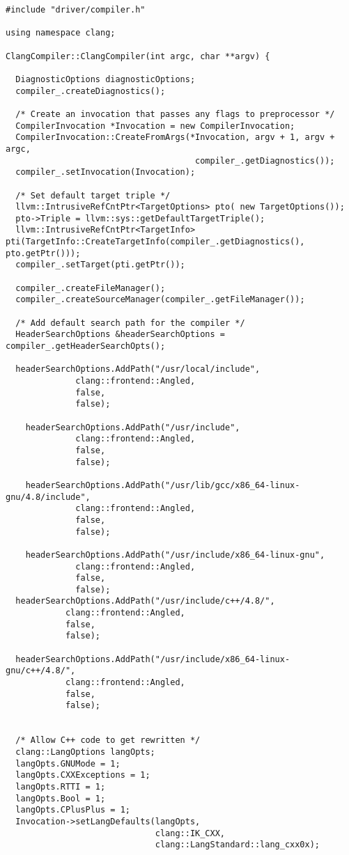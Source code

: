 \documentclass[a4paper,10pt,twoside]{book}
\begin{document}
\begin{lstlisting}[language=CCC, caption=driver/compiler.cpp]
#include "driver/compiler.h"

using namespace clang;

ClangCompiler::ClangCompiler(int argc, char **argv) {

  DiagnosticOptions diagnosticOptions;
  compiler_.createDiagnostics();

  /* Create an invocation that passes any flags to preprocessor */
  CompilerInvocation *Invocation = new CompilerInvocation;
  CompilerInvocation::CreateFromArgs(*Invocation, argv + 1, argv + argc,
                                      compiler_.getDiagnostics());
  compiler_.setInvocation(Invocation);

  /* Set default target triple */
  llvm::IntrusiveRefCntPtr<TargetOptions> pto( new TargetOptions());
  pto->Triple = llvm::sys::getDefaultTargetTriple();
  llvm::IntrusiveRefCntPtr<TargetInfo> pti(TargetInfo::CreateTargetInfo(compiler_.getDiagnostics(), pto.getPtr()));
  compiler_.setTarget(pti.getPtr());

  compiler_.createFileManager();
  compiler_.createSourceManager(compiler_.getFileManager());

  /* Add default search path for the compiler */
  HeaderSearchOptions &headerSearchOptions = compiler_.getHeaderSearchOpts();

  headerSearchOptions.AddPath("/usr/local/include",
	          clang::frontend::Angled,
	          false,
	          false);

	headerSearchOptions.AddPath("/usr/include",
	          clang::frontend::Angled,
	          false,
	          false);

	headerSearchOptions.AddPath("/usr/lib/gcc/x86_64-linux-gnu/4.8/include",
	          clang::frontend::Angled,
	          false,
	          false);

	headerSearchOptions.AddPath("/usr/include/x86_64-linux-gnu",
	          clang::frontend::Angled,
	          false,
	          false);
  headerSearchOptions.AddPath("/usr/include/c++/4.8/",
            clang::frontend::Angled,
            false,
            false);

  headerSearchOptions.AddPath("/usr/include/x86_64-linux-gnu/c++/4.8/",
            clang::frontend::Angled,
            false,
            false);


  /* Allow C++ code to get rewritten */
  clang::LangOptions langOpts;
  langOpts.GNUMode = 1; 
  langOpts.CXXExceptions = 1; 
  langOpts.RTTI = 1; 
  langOpts.Bool = 1; 
  langOpts.CPlusPlus = 1; 
  Invocation->setLangDefaults(langOpts,
                              clang::IK_CXX,
                              clang::LangStandard::lang_cxx0x);


\end{lstlisting}
\end{document}
